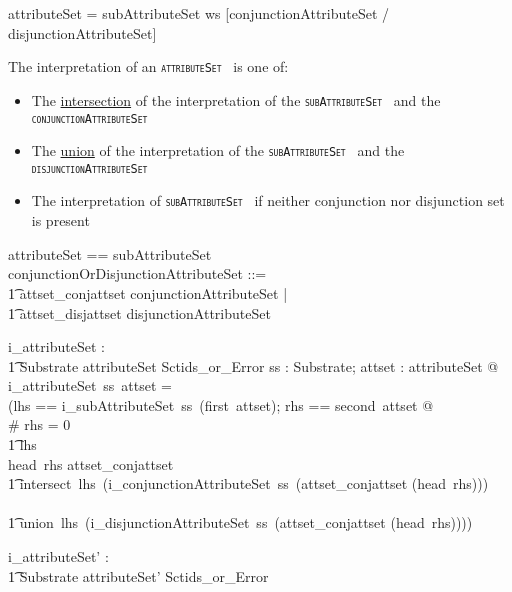 \documentclass{article}
\def\spec#1{{\tt \small \textsc{{#1}} }}
\def\bnf#1{{\scriptsize {{#1}} }}
\begin{document}
\begin{framed}
\noindent
\bnf{attributeSet = subAttributeSet ws [conjunctionAttributeSet / disjunctionAttributeSet]}
\end{framed}

The interpretation of an \spec{attributeSet} is one of:
\begin{itemize}[noitemsep,nolistsep]
\item The \underline{intersection} of the interpretation of the \spec{subAttributeSet} and the \spec{conjunctionAttributeSet}
\item The \underline{union} of the interpretation of the \spec{subAttributeSet} and the \spec{disjunctionAttributeSet}
\item The interpretation of  \spec{subAttributeSet} if neither conjunction nor disjunction set is present
\end{itemize}


\begin{zed}
attributeSet == subAttributeSet \cross \optional[conjunctionOrDisjunctionAttributeSet] \\
[attributeSet']
\also
conjunctionOrDisjunctionAttributeSet ::= \\
\t1 attset\_conjattset \ldata conjunctionAttributeSet \rdata | \\
\t1 attset\_disjattset \ldata disjunctionAttributeSet \rdata
\end{zed}

\begin{gendef}
   i\_attributeSet : \\
\t1 Substrate \fun attributeSet \fun Sctids\_or\_Error
\where
   \forall ss : Substrate; attset : attributeSet @ \\
   i\_attributeSet~ss~attset = \\
   (\LET lhs == i\_subAttributeSet~ss~(first~attset); rhs == second~attset @ \\
 \IF \# rhs = 0 \THEN \\
 \t1 lhs \\
 \ELSE \IF head~rhs \in \ran attset\_conjattset \THEN \\
 \t1  intersect~lhs~(i\_conjunctionAttributeSet~ss~(attset\_conjattset \inv (head~rhs))) \\
  \ELSE \\
  \t1 union~lhs~(i\_disjunctionAttributeSet~ss~(attset\_conjattset \inv (head~rhs))))
\end{gendef}

\begin{gendef}
   i\_attributeSet' : \\
\t1 Substrate \fun attributeSet' \fun Sctids\_or\_Error
\end{gendef}
\end{document}

